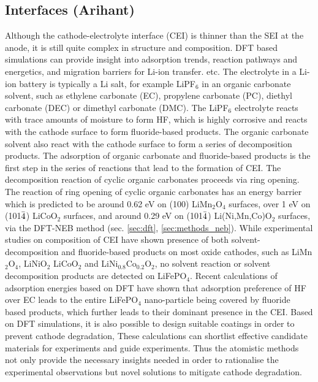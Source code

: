 \documentclass[../main.tex]{subfiles}
\begin{document}
\subsection{Interfaces (Arihant)}
Although the cathode-electrolyte interface (CEI) is thinner than the SEI at the anode, it is still quite complex in structure and composition.\cite{Gauthier2015, Edstrom2004} DFT based simulations can provide insight into adsorption trends,\cite{Bhandari2020} reaction pathways and energetics,\cite{Tebbe2015a, Tebbe2015b} and migration barriers for Li-ion transfer.\cite{Bhandari2019} etc. The electrolyte in a Li-ion battery is typically a Li salt, for example LiPF$_6$ in an organic carbonate solvent, such as ethylene carbonate (EC), propylene carbonate (PC), diethyl carbonate (DEC) or dimethyl carbonate (DMC). The LiPF$_6$ electrolyte reacts with trace amounts of moisture to form HF,\cite{Tebbe2015a} which is highly corrosive and reacts with the cathode surface to form fluoride-based products.\cite{Tebbe2015b} The organic carbonate solvent  also react with the cathode surface to form a series of decomposition products.\cite{Tebbe2016} The adsorption of organic carbonate and fluoride-based products is the first step in the series of reactions that lead to the formation of CEI. The decomposition reaction of cyclic organic carbonates proceeds via ring opening. The reaction of ring opening of cyclic organic carbonates has an energy barrier which is predicted to be around 0.62 eV on (100) LiMn$_2$O$_4$ surfaces,\cite{leung2012first} over 1 eV on (101$\Bar{4}$) LiCoO$_2$ surfaces,\cite{Tebbe2016} and around 0.29 eV on (101$\Bar{4}$) Li(Ni,Mn,Co)O$_2$ surfaces,\cite{Xu2017} via the DFT-NEB method (sec. \ref{sec:dft}, \ref{sec:methods_neb}).\cite{JONSSON1998} While experimental studies on composition of CEI have shown presence of both solvent-decomposition and fluoride-based products on most oxide cathodes, such as LiMn$_2$O$_4$, LiNiO$_2$ LiCoO$_2$ and LiNi$_{0.8}$Co$_{0.2}$O$_2$, no solvent reaction or solvent decomposition products are detected on LiFePO$_4$.\cite{Edstrom2004, Malmgren2010} Recent calculations of adsorption energies based on DFT have shown that adsorption preference of HF over EC leads to the entire LiFePO$_4$ nano-particle being covered by fluoride based products, which further leads to their dominant presence in the CEI.\cite{Bhandari2020} Based on DFT simulations, it is also possible to design suitable coatings in order to prevent cathode degradation,\cite{Tebbe2015b} These calculations can shortlist effective candidate materials for experiments and guide experiments. Thus the atomistic methods not only provide the necessary insights needed in order to rationalise the experimental observations but novel solutions to mitigate cathode degradation.
\end{document}
